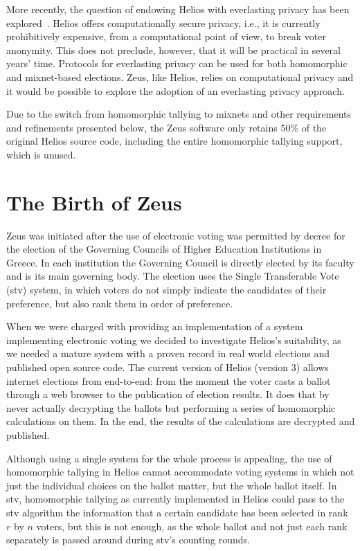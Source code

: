 \documentclass[letterpaper,10pt]{article}
\begin{document}
More recently, the question of endowing Helios with everlasting
privacy has been explored~\cite{demirel:2012}. Helios offers
computationally secure privacy, i.e., it is currently prohibitively
expensive, from a computational point of view, to break voter
anonymity. This does not preclude, however, that it will be
practical in several years' time. Protocols for everlasting privacy
can be used for both homomorphic and mixnet-based elections. Zeus,
like Helios, relies on computational privacy and it would be possible
to explore the adoption of an everlasting privacy approach.

Due to the switch from homomorphic tallying to mixnets and other
requirements and refinements presented below, the Zeus software only
retains 50\% of the original Helios source code, including the entire
homomorphic tallying support, which is unused.

\section{The Birth of Zeus}
\label{sec:birth}

Zeus was initiated after the use of electronic voting was permitted by
decree for the election of the Governing Councils of Higher Education
Institutions in Greece. In each institution the Governing Council is
directly elected by its faculty and is its main governing body. The
election uses the Single Transferable Vote ({\sc stv}) system, in which
voters do not simply indicate the candidates of their preference, but
also rank them in order of preference. 

When we were charged with providing an implementation of a system
implementing electronic voting we decided to investigate Helios's
suitability, as we needed a mature system with a proven record in real
world elections and published open source code. The current version of
Helios (version 3) allows internet elections from end-to-end: from the
moment the voter casts a ballot through a web browser to the
publication of election results. It does that by never actually
decrypting the ballots but performing a series of homomorphic
calculations on them. In the end, the results of the calculations are
decrypted and published. 

Although using a single system for the whole process is appealing, the
use of homomorphic tallying in Helios cannot accommodate voting
systems in which not just the individual choices on the ballot matter,
but the whole ballot itself. In {\sc stv}, homomorphic tallying as
currently implemented in Helios could pass to the {\sc stv} algorithm
the information that a certain candidate has been selected in rank $r$
by $n$ voters, but this is not enough, as the whole ballot and not
just each rank separately is passed around during {\sc stv}'s counting
rounds.
\end{document}
